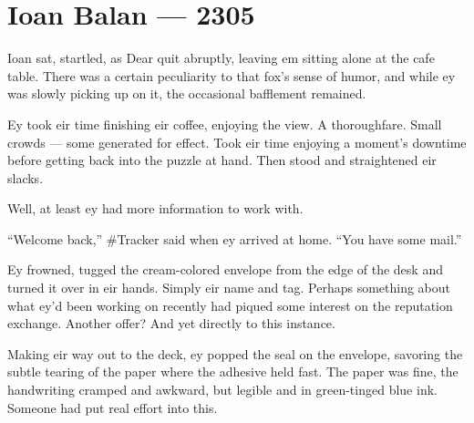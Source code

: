 \hypertarget{ioan-balan-2305}{%
\chapter*{Ioan Balan — 2305}\label{ioan-balan-2305}}

Ioan sat, startled, as Dear quit abruptly, leaving em sitting alone at the cafe table. There was a certain peculiarity to that fox's sense of humor, and while ey was slowly picking up on it, the occasional bafflement remained.

Ey took eir time finishing eir coffee, enjoying the view. A thoroughfare. Small crowds — some generated for effect. Took eir time enjoying a moment's downtime before getting back into the puzzle at hand. Then stood and straightened eir slacks.

Well, at least ey had more information to work with.

``Welcome back,'' \#Tracker said when ey arrived at home. ``You have some mail.''

Ey frowned, tugged the cream-colored envelope from the edge of the desk and turned it over in eir hands. Simply eir name and tag. Perhaps something about what ey'd been working on recently had piqued some interest on the reputation exchange. Another offer? And yet directly to this instance.

Making eir way out to the deck, ey popped the seal on the envelope, savoring the subtle tearing of the paper where the adhesive held fast. The paper was fine, the handwriting cramped and awkward, but legible and in green-tinged blue ink. Someone had put real effort into this.

